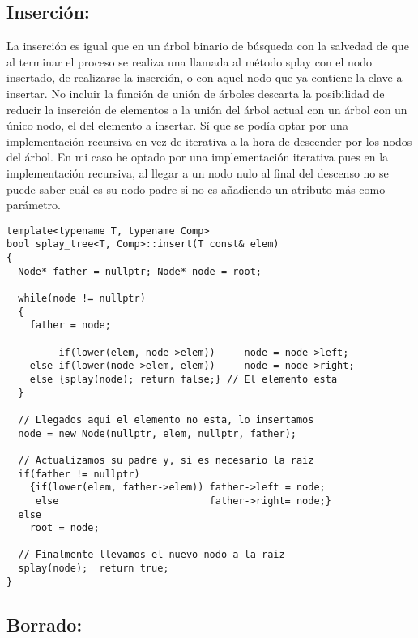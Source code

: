 \documentclass[letterpaper,12pt]{article}
\begin{document}
\subsection{Inserción:}

La inserción es igual que en un árbol binario de búsqueda con la salvedad de 
que al terminar el proceso se realiza una llamada al método splay con el nodo 
insertado, de realizarse la inserción, o con aquel nodo que ya contiene la 
clave a insertar. No incluir la función de unión de árboles descarta la 
posibilidad de reducir la inserción de elementos a la unión del árbol actual
con un árbol con un único nodo, el del elemento a insertar. Sí que se podía
optar por una implementación recursiva en vez de iterativa a la hora de 
descender por los nodos del árbol. En mi caso he optado por una implementación
iterativa pues en la implementación recursiva, al llegar a un nodo nulo al
final del descenso no se puede saber cuál es su nodo padre si no es añadiendo
un atributo más como parámetro. 

\begin{lstlisting}
template<typename T, typename Comp>
bool splay_tree<T, Comp>::insert(T const& elem)
{
  Node* father = nullptr; Node* node = root;

  while(node != nullptr)
  {
    father = node;

         if(lower(elem, node->elem))     node = node->left;
    else if(lower(node->elem, elem))     node = node->right;
    else {splay(node); return false;} // El elemento esta
  }

  // Llegados aqui el elemento no esta, lo insertamos
  node = new Node(nullptr, elem, nullptr, father);

  // Actualizamos su padre y, si es necesario la raiz
  if(father != nullptr)
    {if(lower(elem, father->elem)) father->left = node;
     else                          father->right= node;}
  else
    root = node;

  // Finalmente llevamos el nuevo nodo a la raiz
  splay(node);  return true;
}
\end{lstlisting}

\subsection{Borrado:}
\end{document}
